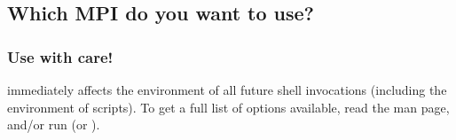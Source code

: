 %
%
%
%

\subsection{Which MPI do you want to use?}
\label{app:switcher-which-mpi-to-use}




\subsubsection{Use  with care!}

 immediately affects the environment of all future shell
invocations (including the environment of scripts).  To get a full
list of options available, read the  man page, and/or
run  (or ).
